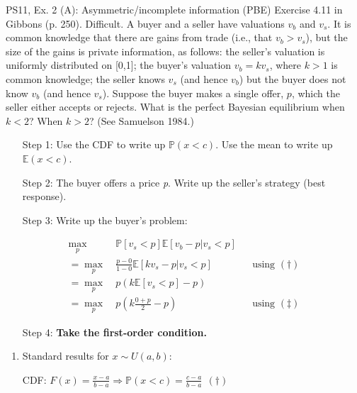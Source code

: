\begin{frame}{PS11, Ex. 2 (A): Asymmetric/incomplete information (PBE)}
    Exercise 4.11 in Gibbons (p. 250). Difficult. A buyer and a seller have valuations $v_b$ and $v_s$. It is common knowledge that there are gains from trade (i.e., that $v_b > v_s$), but the size of the gains is private information, as follows: the seller’s valuation is uniformly distributed on [0,1]; the buyer’s valuation $v_b = kv_s$, where $k > 1$ is common knowledge; the seller knows $v_s$ (and hence $v_b$) but the buyer does not know $v_b$ (and hence $v_s$). Suppose the buyer makes a single offer, $p$, which the seller either accepts or rejects. What is the perfect Bayesian equilibrium when $k < 2$? When $k > 2$? (See Samuelson 1984.) \vspace{-8pt}
    \begin{multicols}{2}
      \begin{itemize}
        \item[Step 1:] Use the CDF to write up $\mathbb{P}(x<c)$. Use the mean to write up $\mathbb{E}(x<c)$.
        \item[Step 2:] The buyer offers a price \textit{p}. Write up the seller's strategy (best response).
        \item[Step 3:] Write up the buyer's problem:
      \end{itemize} \vspace{-8pt}
      \begin{align*}
         \displaystyle{\max_p}&\ \mathbb{P}[v_s<p]\mathbb{E}[v_b-p|v_s<p]\\
        =\displaystyle{\max_p}&\ \frac{p-0}{1-0}\mathbb{E}[kv_s-p|v_s<p]&&\text{using }(\dagger)\\
        =\displaystyle{\max_p}&\ p\left(k\mathbb{E}[v_s<p]-p\right)\\
        =\displaystyle{\max_p}&\ p\left(k\frac{0+p}{2}-p\right)&&\text{using }(\ddagger)
      \end{align*} \vspace{-8pt}
      \begin{itemize}
        \item[Step 4:] \textbf{Take the first-order condition.}
      \end{itemize}
      \vfill\null\columnbreak
      \begin{enumerate}
        \item Standard results for $x\sim U(a, b):$
        \item[CDF:] $F(x)=\frac{x-a}{b-a}\Rightarrow\mathbb{P}(x<c)=\frac{c-a}{b-a}\ \ (\dagger)$

\end{enumerate}
\end{multicols}
\end{frame}
